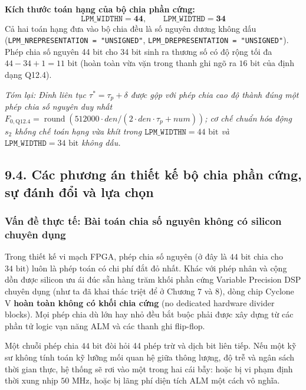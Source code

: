 \begin{equationcard}
\textbf{Kích thước toán hạng của bộ chia phần cứng:}
\begin{equation}
\texttt{LPM\_WIDTHN} = \mathbf{44}, \qquad \texttt{LPM\_WIDTHD} = \mathbf{34}
\end{equation}
Cả hai toán hạng đưa vào bộ chia đều là số nguyên dương không dấu (\texttt{LPM\_NREPRESENTATION = "UNSIGNED"}, \texttt{LPM\_DREPRESENTATION = "UNSIGNED"}). Phép chia số nguyên 44 bit cho 34 bit sinh ra thương số có độ rộng tối đa $44 - 34 + 1 = 11\text{ bit}$ (hoàn toàn vừa vặn trong thanh ghi ngõ ra $16\text{ bit}$ của định dạng Q12.4).
\end{equationcard}

\textit{Tóm lại: Đỉnh liên tục $\tau^* = \tau_p + \delta$ được gộp với phép chia cao độ thành đúng một phép chia số nguyên duy nhất $F_{0, \text{Q12.4}} = \operatorname{round}(512000 \cdot den / (2 \cdot den \cdot \tau_p + num))$; cơ chế chuẩn hóa động $s_2$ khống chế toán hạng vừa khít trong $\texttt{LPM\_WIDTHN} = 44\text{ bit}$ và $\texttt{LPM\_WIDTHD} = 34\text{ bit}$ không dấu.}

\subsection*{9.4. Các phương án thiết kế bộ chia phần cứng, sự đánh đổi và lựa chọn}

\subsubsection*{Vấn đề thực tế: Bài toán chia số nguyên không có silicon chuyên dụng}
Trong thiết kế vi mạch FPGA, phép chia số nguyên (ở đây là $44\text{ bit}$ chia cho $34\text{ bit}$) luôn là phép toán có chi phí đắt đỏ nhất. Khác với phép nhân và cộng dồn được silicon ưu ái đúc sẵn hàng trăm khối phần cứng Variable Precision DSP chuyên dụng (như ta đã khai thác triệt để ở Chương 7 và 8), dòng chip Cyclone V \textbf{hoàn toàn không có khối chia cứng} (no dedicated hardware divider blocks). Mọi phép chia dù lớn hay nhỏ đều bắt buộc phải được xây dựng từ các phần tử logic vạn năng ALM và các thanh ghi flip-flop.

Một chuỗi phép chia $44\text{ bit}$ đòi hỏi 44 phép trừ và dịch bit liên tiếp. Nếu một kỹ sư không tính toán kỹ lưỡng mối quan hệ giữa thông lượng, độ trễ và ngân sách thời gian thực, hệ thống sẽ rơi vào một trong hai cái bẫy: hoặc bị vi phạm định thời xung nhịp $50\text{ MHz}$, hoặc bị lãng phí diện tích ALM một cách vô nghĩa.

